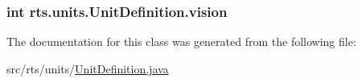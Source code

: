 \label{classrts_1_1units_1_1_unit_definition_acc95d3f7943d9a68537bcfd80663e40f}
\hypertarget{classrts_1_1units_1_1_unit_definition_a9a1bbc5eb71c750e90afc3a79dc3b77e}{
\subsubsection[{vision}]{\setlength{\rightskip}{0pt plus 5cm}int {\bf rts.units.UnitDefinition.vision}}}
\label{classrts_1_1units_1_1_unit_definition_a9a1bbc5eb71c750e90afc3a79dc3b77e}


The documentation for this class was generated from the following file:\begin{DoxyCompactItemize}
\item 
src/rts/units/\hyperlink{_unit_definition_8java}{UnitDefinition.java}\end{DoxyCompactItemize}
